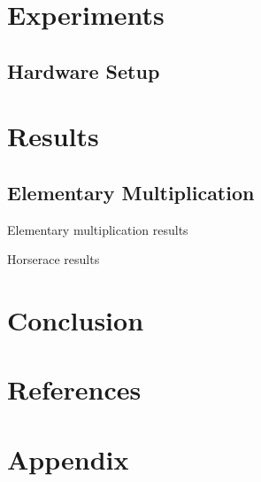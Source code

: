 \documentclass[12pt, a4paper]{article}
\begin{document}
\section{Experiments}

\subsection{Hardware Setup}


\section{Results}
\subsection{Elementary Multiplication}
\begin{table}[p]
\begin{center}
\label{tbl:horse_ele}

\caption{Elementary multiplication results}
\end{center}
\end{table}


\begin{table}[p]
\begin{center}
\label{tbl:horse}

\caption{Horserace results}
\end{center}
\end{table}

\section{Conclusion}

\section{References}

\section{Appendix}
\end{document}
